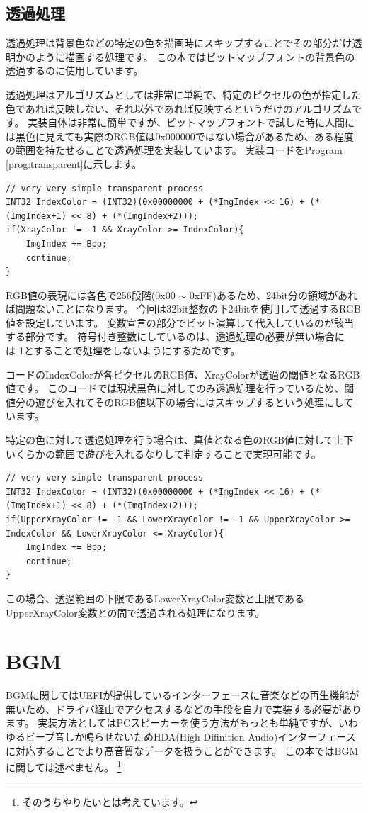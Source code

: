 \documentclass[10pt,b5paper,twoside,openany]{ltjsbook}
\begin{document}
\subsection{透過処理}
透過処理は背景色などの特定の色を描画時にスキップすることでその部分だけ透明かのように描画する処理です。
この本ではビットマップフォントの背景色の透過するのに使用しています。

透過処理はアルゴリズムとしては非常に単純で、特定のピクセルの色が指定した色であれば反映しない、それ以外であれば反映するというだけのアルゴリズムです。
実装自体は非常に簡単ですが、ビットマップフォントで試した時に人間には黒色に見えても実際のRGB値は0x000000ではない場合があるため、ある程度の範囲を持たせることで透過処理を実装しています。
実装コードをProgram \ref{prog:transparent}に示します。
\begin{lstlisting}[style=customC,caption=Transparent process,label=prog:transparent]
// very very simple transparent process
INT32 IndexColor = (INT32)(0x00000000 + (*ImgIndex << 16) + (*(ImgIndex+1) << 8) + (*(ImgIndex+2)));
if(XrayColor != -1 && XrayColor >= IndexColor){
    ImgIndex += Bpp;
    continue;
} 
\end{lstlisting}
RGB値の表現には各色で256段階(0x00 $\sim$ 0xFF)あるため、24bit分の領域があれば問題ないことになります。
今回は32bit整数の下24bitを使用して透過するRGB値を設定しています。
変数宣言の部分でビット演算して代入しているのが該当する部分です。
符号付き整数にしているのは、透過処理の必要が無い場合には-1とすることで処理をしないようにするためです。

コードのIndexColorが各ピクセルのRGB値、XrayColorが透過の閾値となるRGB値です。
このコードでは現状黒色に対してのみ透過処理を行っているため、閾値分の遊びを入れてそのRGB値以下の場合にはスキップするという処理にしています。

特定の色に対して透過処理を行う場合は、真値となる色のRGB値に対して上下いくらかの範囲で遊びを入れるなりして判定することで実現可能です。
\begin{lstlisting}[style=customC,caption=Transparent process,label=prog:transparent]
// very very simple transparent process
INT32 IndexColor = (INT32)(0x00000000 + (*ImgIndex << 16) + (*(ImgIndex+1) << 8) + (*(ImgIndex+2)));
if(UpperXrayColor != -1 && LowerXrayColor != -1 && UpperXrayColor >= IndexColor && LowerXrayColor <= XrayColor){
    ImgIndex += Bpp;
    continue;
} 
\end{lstlisting}
この場合、透過範囲の下限であるLowerXrayColor変数と上限であるUpperXrayColor変数との間で透過される処理になります。

\section{BGM}
BGMに関してはUEFIが提供しているインターフェースに音楽などの再生機能が無いため、ドライバ経由でアクセスするなどの手段を自力で実装する必要があります。
実装方法としてはPCスピーカーを使う方法がもっとも単純ですが、いわゆるビープ音しか鳴らせないためHDA(High Difinition Audio)インターフェースに対応することでより高音質なデータを扱うことができます。
この本ではBGMに関しては述べません。
\footnote{そのうちやりたいとは考えています。}
\end{document}
